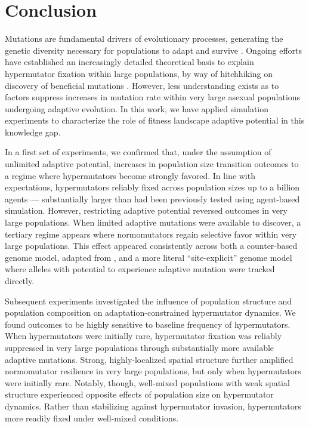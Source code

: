 \section{Conclusion} \label{sec:conclusion}

Mutations are fundamental drivers of evolutionary processes, generating the genetic diversity necessary for populations to adapt and survive \citep{hershberg2015mutation}.
Ongoing efforts have established an increasingly detailed theoretical basis to explain hypermutator fixation within large populations, by way of hitchhiking on discovery of beneficial mutations \citep{TODO}.
However, less understanding exists as to factors suppress increases in mutation rate within very large asexual populations undergoing adaptive evolution.
In this work, we have applied simulation experiments to characterize the role of fitness landscape adaptive potential in this knowledge gap.

In a first set of experiments, we confirmed that, under the assumption of unlimited adaptive potential, increases in population size transition outcomes to a regime where hypermutators become strongly favored.
In line with expectations, hypermutators reliably fixed across population sizes up to a billion agents — substantially larger than had been previously tested using agent-based simulation.
However, restricting adaptive potential reversed outcomes in very large populations.
When limited adaptive mutations were available to discover, a tertiary regime appears where normomutators regain selective favor within very large populations.
This effect appeared consistently across both a counter-based genome model, adapted from \citet{raynes2018sign}, and a more literal ``site-explicit'' genome model where alleles with potential to experience adaptive mutation were tracked directly.

Subsequent experiments investigated the influence of population structure and population composition on adaptation-constrained hypermutator dynamics.
We found outcomes to be highly sensitive to baseline frequency of hypermutators.
When hypermutators were initially rare, hypermutator fixation was reliably suppressed in very large populations through substantially more available adaptive mutations.
Strong, highly-localized spatial structure further amplified normomutator resilience in very large populations, but only when hypermutators were initially rare.
Notably, though, well-mixed populations with weak spatial structure experienced opposite effects of population size on hypermutator dynamics.
Rather than stabilizing against hypermutator invasion, hypermutators more readily fixed under well-mixed conditions.


